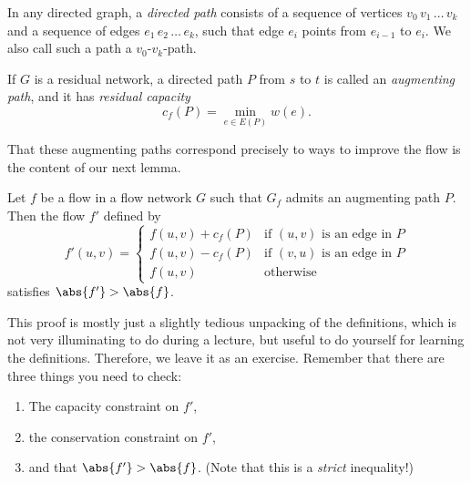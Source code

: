 \documentclass[nobib]{tufte-handout}
\begin{document}
\begin{definition}
    In any directed graph, a \emph{directed path} consists of a sequence of vertices $v_0\, v_1\, \ldots\, v_k$ and a sequence of edges $e_1\, e_2\, \ldots\, e_k$, such that edge $e_i$ points from $e_{i-1}$ to $e_i$. We also call such a path a $v_0$-$v_k$-path.

    If $G$ is a residual network, a directed path $P$ from $s$ to $t$ is called an \emph{augmenting path}, and it has \emph{residual capacity}
    $$c_f(P) = \min_{e\in E(P)} w(e).$$
\end{definition}

That these augmenting paths correspond precisely to ways to improve the flow is the content of our next lemma.

\begin{lemma}\label{lemma:can_augment_flows}
    Let $f$ be a flow in a flow network $G$ such that $G_f$ admits an augmenting path $P$. Then the flow $f'$ defined by
    $$f'(u,v) = \begin{cases}
        f(u,v) + c_f(P)&\text{if }(u,v)\text{ is an edge in }P\\
        f(u,v) - c_f(P)&\text{if }(v,u)\text{ is an edge in }P\\
        f(u,v)&\text{otherwise}
    \end{cases}$$
    satisfies $\abs{f'} > \abs{f}$.

    \begin{xca}
        This proof is mostly just a slightly tedious unpacking of the definitions, which is not very illuminating to do during a lecture, but useful to do yourself for learning the definitions. Therefore, we leave it as an exercise. Remember that there are three things you need to check:
        \begin{enumerate}
            \item The capacity constraint on $f'$,
            \item the conservation constraint on $f'$,
            \item and that $\abs{f'} > \abs{f}$. (Note that this is a \emph{strict} inequality!)
        \end{enumerate}
    \end{xca}
\end{lemma}
\end{document}
